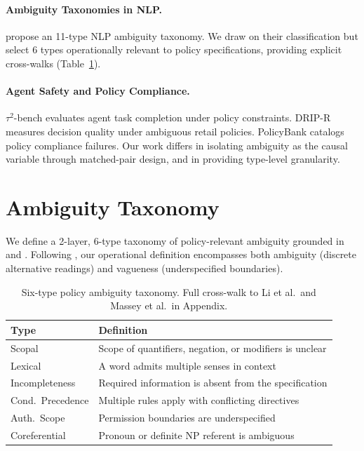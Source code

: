 \documentclass[11pt,a4paper]{article}
\begin{document}
\paragraph{Ambiguity Taxonomies in NLP.}
\citet{li2024taxonomy} propose an 11-type NLP ambiguity taxonomy. We draw on their classification but select 6 types operationally relevant to policy specifications, providing explicit cross-walks (Table~\ref{tab:taxonomy}).

\paragraph{Agent Safety and Policy Compliance.}
$\tau^2$-bench \cite{yao2024tau2bench} evaluates agent task completion under policy constraints. DRIP-R \cite{liu2024dripr} measures decision quality under ambiguous retail policies. PolicyBank \cite{chen2024policybank} catalogs policy compliance failures. Our work differs in isolating ambiguity as the causal variable through matched-pair design, and in providing type-level granularity.

\section{Ambiguity Taxonomy}
\label{sec:taxonomy}

We define a 2-layer, 6-type taxonomy of policy-relevant ambiguity grounded in \citet{li2024taxonomy} and \citet{massey2014evaluating}. Following \citet{wasow2005intuitions}, our operational definition encompasses both ambiguity (discrete alternative readings) and vagueness (underspecified boundaries).

\begin{table}[t]
\centering
\small
\begin{tabular}{@{}lp{4.8cm}@{}}
\toprule
\textbf{Type} & \textbf{Definition} \\
\midrule
Scopal & Scope of quantifiers, negation, or modifiers is unclear \\
Lexical & A word admits multiple senses in context \\
Incompleteness & Required information is absent from the specification \\
Cond.\ Precedence & Multiple rules apply with conflicting directives \\
Auth.\ Scope & Permission boundaries are underspecified \\
Coreferential & Pronoun or definite NP referent is ambiguous \\
\bottomrule
\end{tabular}
\caption{Six-type policy ambiguity taxonomy. Full cross-walk to Li et al.\ and Massey et al.\ in Appendix.}
\label{tab:taxonomy}
\end{table}
\end{document}
